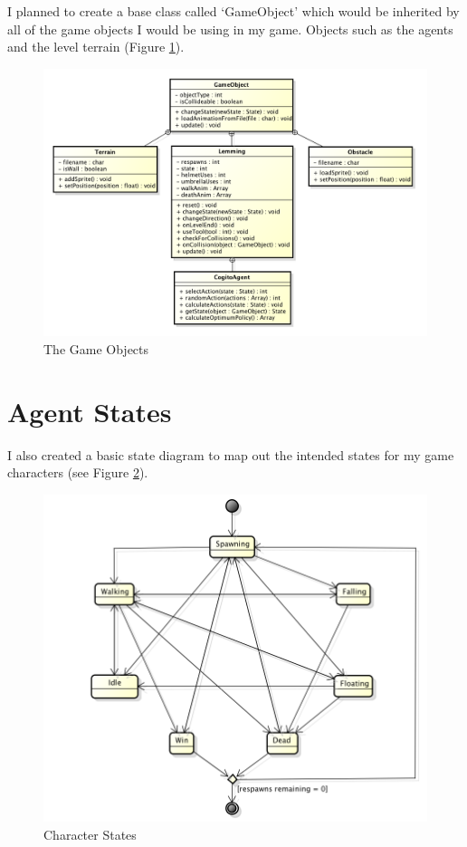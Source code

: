 \documentclass[a4paper,oneside]{report}
\begin{document}
I planned to create a base class called `GameObject' which would be inherited by all of the game objects I would be using in my game. Objects such as the agents and the level terrain (Figure \ref{fig:GameObjects}).

\begin{figure}[H]
  \centering
    \includegraphics[width=150mm]{sources/images/GameObjects}
    \caption{The Game Objects}
    \label{fig:GameObjects}
\end{figure}
	
\newpage
	
\section{Agent States}

I also created a basic state diagram to map out the intended states for my game characters (see Figure \ref{fig:LemmingFSM}).

\begin{figure}[H]
  \centering
    \includegraphics[width=120mm]{sources/images/LemmingStatemachine}
    \caption{Character States}
    \label{fig:LemmingFSM}
\end{figure}
	
\end{document}
